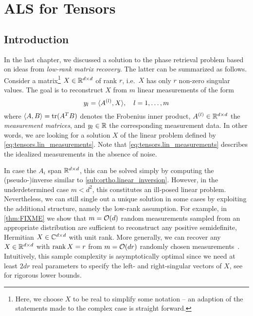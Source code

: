 \section{ALS for Tensors}%
\label{sec:tensors.als}

\subsection{Introduction}
\label{sub:tensors.als.introduction}

In the last chapter, we discussed a solution to the phase retrieval problem based on ideas from \emph{low-rank matrix recovery}.
The latter can be summarized as follows.
Consider a matrix\footnote{%
  Here, we choose $X$ to be real to simplify some notation -- an adaption of the statements made to the complex case is straight forward.
}
$X \in {\mathbb{R}}^{d \times d}$ of rank $r$, i.e.\ $X$ has only $r$ non-zero singular values.
The goal is to reconstruct $X$ from $m$ linear measurements of the form
\[
  y_l = {\braket{A^{(l)}, X}}, \quad l=1,\ldots,m
  \label{eq:tensors.lin_measurements}
\]
where $\braket{A, B} = \operatorname{tr} ({{A}^T} B)$ denotes the Frobenius inner product, $A^{(l)} \in {\mathbb{R}}^{d \times d}$ the \emph{measurement matrices}, and $y_l \in {\mathbb{R}}$ the corresponding measurement data.
In other words, we are looking for a solution $X$ of the linear problem defined by \cref{eq:tensors.lin_measurements}.
Note that \cref{eq:tensors.lin_measurements} describes the idealized measurements in the absence of noise.

In case the $A_i$ span ${\mathbb{R}}^{d \times d}$, this can be solved simply by computing the (pseudo-)inverse similar to \cref{sub:ortho.linear_inversion}.
However, in the underdetermined case $m < d^{2}$, this constitutes an ill-posed linear problem.
Nevertheless, we can still single out a unique solution in some cases by exploiting the additional structure, namely the low-rank assumption.
For example, in \cref{thm:FIXME} we show that $m = {\mathcal{O}}(d)$ random measurements sampled from an appropriate distribution are sufficient to reconstruct any positive semidefinite, Hermitian $X \in {\mathbb{C}}^{d \times d}$ with unit rank.
More generally, we can recover any $X \in {\mathbb{R}}^{d \times d}$ with $\operatorname{rank} X = r$ from $m = {\mathcal{O}}(d r)$ randomly chosen measurements~\cite{Candes_2011_Tight,Kueng_2014_Low}.
Intuitively, this sample complexity is asymptotically optimal since we need at least $2 d r$ real parameters to specify the left- and right-singular vectors of $X$, see~\cite{Eldar_2012_Uniqueness,Li_2017_Optimal} for rigorous lower bounds.

